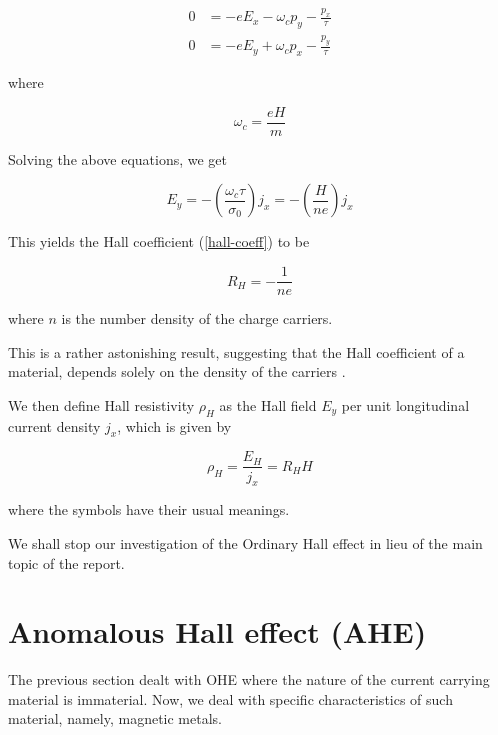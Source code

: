 \begin{equation}
    \begin{split}
        0 &= -e E_x - \omega_c p_y - \frac{p_x}{\tau}\\
        0 &= -e E_y + \omega_c p_x - \frac{p_y}{\tau}
    \end{split}
\end{equation}

where

\begin{equation}
    \omega_c = \frac{e H}{m}
\end{equation}

Solving the above equations, we get

\begin{equation}
    E_y = - \left( \frac{\omega_c \tau}{\sigma_0}  \right) j_x = - \left( \frac{H}{ne} \right) j_x
\end{equation}

This yields the Hall coefficient (\cref{hall-coeff}) to be

\begin{equation}
    \boxed{R_H = - \frac{1}{ne}}
\end{equation}

where $ n $ is the number density of the charge carriers.

This is a rather astonishing result, suggesting that the Hall coefficient of a material, depends solely on the density of the carriers \cite{ashcroft1976solid}.

We then define Hall resistivity $ \rho_H $ as the Hall field $ E_y $ per unit longitudinal current density $ j_x $, which is given by

\begin{equation} \label{hall-resistivity}
    \boxed{\rho_H = \frac{E_H}{j_x} = R_H H}
\end{equation}

where the symbols have their usual meanings.

We shall stop our investigation of the Ordinary Hall effect in lieu of the main topic of the report.

\section{Anomalous Hall effect (AHE)}

The previous section dealt with OHE where the nature of the current carrying material is immaterial.
Now, we deal with specific characteristics of such material, namely, magnetic metals.

